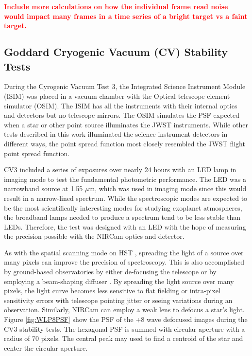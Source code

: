 \documentclass{aastex62}
\begin{document}
\textcolor{red}{\bf Include more calculations on how the individual frame read noise would impact many frames in a time series of a bright target vs a faint target.}

\subsection{Goddard Cryogenic Vacuum (CV) Stability Tests}

During the Cyrogenic Vacuum Test 3, the Integrated Science Instrument Module (ISIM) was placed in a vacuum chamber with the Optical telescope element simulator (OSIM).
The ISIM has all the instruments with their internal optics and detectors but no telescope mirrors.
The OSIM simulates the PSF expected when a star or other point source illuminates the JWST instruments.
While other tests described in this work illuminated the science instrument detectors in different ways, the point spread function most closely resembled the JWST flight point spread function.

CV3 included a series of exposures over nearly 24 hours with an LED lamp in imaging mode to test the fundamental photometric performance.
The LED was a narrowband source at 1.55 $\mu$m, which was used in imaging mode since this would result in a narrow-lined spectrum.
While the spectroscopic modes are expected to be the most scientifically interesting modes for studying exoplanet atmospheres, the broadband lamps needed to produce a spectrum tend to be less stable than LEDs.
Therefore, the test was designed with an LED with the hope of measuring the precision possible with the NIRCam optics and detector.

As with the spatial scanning mode on HST \citep[e.g.][]{mccullough2012spatialScan,deming13}, spreading the light of a source over many pixels can improve the precision of spectroscopy.
This is also accomplished by ground-based observatories by either de-focusing the telescope \citep{southworth2009defocusing} or by employing a beam-shaping diffuser \citep{stefansson2017diffusers}.
By spreading the light source over many pixels, the light curve becomes less sensitive to flat fielding or intra-pixel sensitivity errors with telescope pointing jitter or seeing variations during an observation.
Similarly, NIRCam can employ a weak lens to defocus a star's light.
Figure \ref{fig:WLP8PSF} show the PSF of the +8 wave defocused images during the CV3 stability tests.
The hexagonal PSF is summed with circular aperture with a radius of 70 pixels.
The central peak may used to find a centroid of the star and center the circular aperture.
\end{document}
